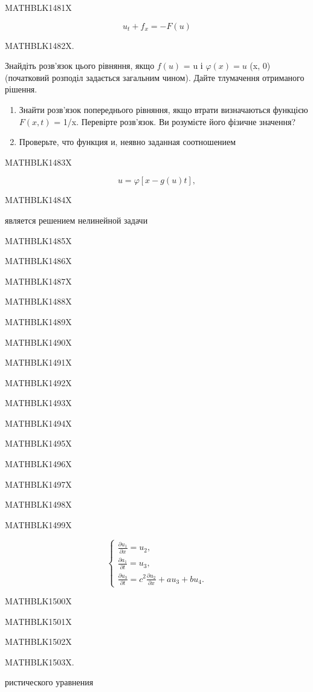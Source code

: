 \documentclass[
  ukrainian,
]{article}
\begin{document}
MATHBLK1481X

\[
u_t + f_x = -F(u)
\]

MATHBLK1482X.

Знайдіть розв'язок цього рівняння, якщо \(f(u)\) = u і
\(\varphi(x) = u\) (x, 0) (початковий розподіл задається загальним
чином). Дайте тлумачення отриманого рішення.

\begin{enumerate}
\def\labelenumi{\arabic{enumi}.}
\setcounter{enumi}{3}
\item
  Знайти розв'язок попереднього рівняння, якщо втрати визначаються
  функцією \(F(x, t)\) = 1/x. Перевірте розв'язок. Ви розумієте його
  фізичне значення?
\item
  Проверьте, что функция и, неявно заданная соотношением
\end{enumerate}

MATHBLK1483X

\[
u = \varphi[x - g(u) t],
\]

MATHBLK1484X

является решением нелинейной задачи

MATHBLK1485X

MATHBLK1486X

MATHBLK1487X

MATHBLK1488X

MATHBLK1489X

MATHBLK1490X

MATHBLK1491X

MATHBLK1492X

MATHBLK1493X

MATHBLK1494X

MATHBLK1495X

MATHBLK1496X

MATHBLK1497X

MATHBLK1498X

MATHBLK1499X

\[
\begin{cases} \frac{\partial u_1}{\partial x} = u_2, \\ \frac{\partial a_1}{\partial t} = u_3, \\ \frac{\partial u_3}{\partial t} = c^2 \frac{\partial u_2}{\partial x} + au_3 + bu_4. \end{cases}
\]

MATHBLK1500X

MATHBLK1501X

MATHBLK1502X

MATHBLK1503X.

ристического уравнения
\end{document}
